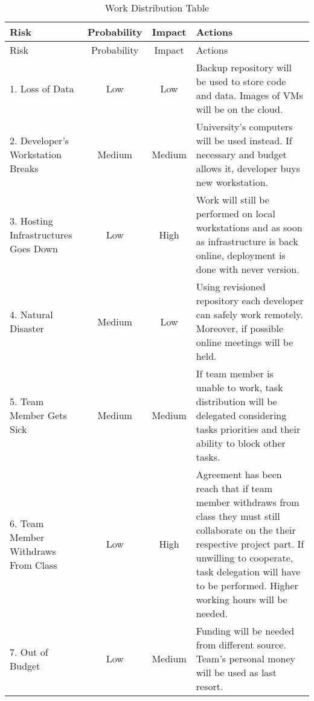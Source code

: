 \begin{center}
\setlength{\extrarowheight}{1.5pt}
    \begin{longtable}{|p{5cm}|c|c|p{7cm}|}
 \caption{Work Distribution Table} \\
     \hline
    
    \centering  Risk & Probability & Impact & Actions \\
    \hline \hline \endfirsthead
    
         \hline

	\centering  Risk & Probability & Impact & Actions \\    
	\hline \hline \endhead
    
    \endfoot  

    1. Loss of Data    & Low           & Low      & Backup repository will be used to store code and data. Images of VMs will be on the cloud.       \\ \hline
    2. Developer's Workstation Breaks  & Medium           & Medium      & University's computers will be used instead. If necessary and budget allows it, developer buys new workstation.       \\  \hline
    3. Hosting Infrastructures Goes Down    & Low           & High      & Work will still be performed on local workstations and as soon as infrastructure is back online, deployment is done with never version.       \\  \hline
    4. Natural Disaster    & Medium           & Low      & Using revisioned repository each developer can safely work remotely. Moreover, if possible online meetings will be held.       \\  \hline
    5. Team Member Gets Sick    & Medium           & Medium      & If team member is unable to work, task distribution will be delegated considering tasks priorities and their ability to block other tasks.       \\  \hline
    6. Team Member Withdraws From Class   & Low           & High      & Agreement has been reach that if team member withdraws from class they must still collaborate on the their respective project part. If unwilling to cooperate, task delegation will have to be performed. Higher working hours will be needed.       \\  \hline
    7. Out of Budget    & Low           & Medium      & Funding will be needed from different source. Team's personal money will be used as last resort.       \\  \hline
    \end{longtable}
\end{center}
